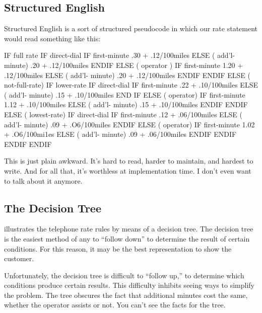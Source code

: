 \subsection{Structured English}

Structured English is a sort of structured pseudocode in which our rate
statement would read something like this:

\begin{Code}[baselinestretch=0.95]
IF full rate
   IF direct-dial
      IF first-minute
	 .30 + .12/100miles
      ELSE ( add'l- minute)
	 .20 + .12/100miles
      ENDIF
   ELSE ( operator )
      IF first-minute
	 1.20 + .12/100miles
      ELSE ( add'l- minute)
	 .20 + .12/100miles
      ENDIF
   ENDIF
ELSE  ( not-full-rate)
   IF lower-rate
      IF direct-dial
	 IF first-minute
	    .22 + .10/100miles
	 ELSE ( add'l- minute)
	    .15 + .10/100miles
	 END IF
      ELSE ( operator)
	 IF first-minute
	    1.12 + .10/100miles
	 ELSE ( add'l- minute)
	    .15 + .10/100miles
	 ENDIF
      ENDIF
   ELSE ( lowest-rate)
      IF direct-dial
	 IF first-minute
	    .12 + .06/100miles
	 ELSE ( add'l- minute)
	    .09 + .O6/100miles
	 ENDIF
      ELSE ( operator)
	 IF first-minute
	    1.02 + .O6/100mi1es
	 ELSE ( add'l- minute)
	    .09 + .06/100miles
	 ENDIF
      ENDIF
   ENDIF
ENDIF
\end{Code}
This is just plain awkward. It's hard to read, harder to maintain, and
hardest to write. And for all that, it's worthless at implementation
time. I don't even want to talk about it anymore.

\subsection{The Decision Tree}

 illustrates the telephone rate rules by means of a
decision tree.  The decision tree is the easiest method of any to
``follow down'' to determine the result of certain conditions. For
this reason, it may be the best representation to show the customer.


Unfortunately, the decision tree is difficult to ``follow up,'' to
determine which conditions produce certain results. This difficulty
inhibits seeing ways to simplify the problem. The tree obscures the
fact that additional minutes cost the same, whether the operator
assists or not. You can't see the facts for the tree.

